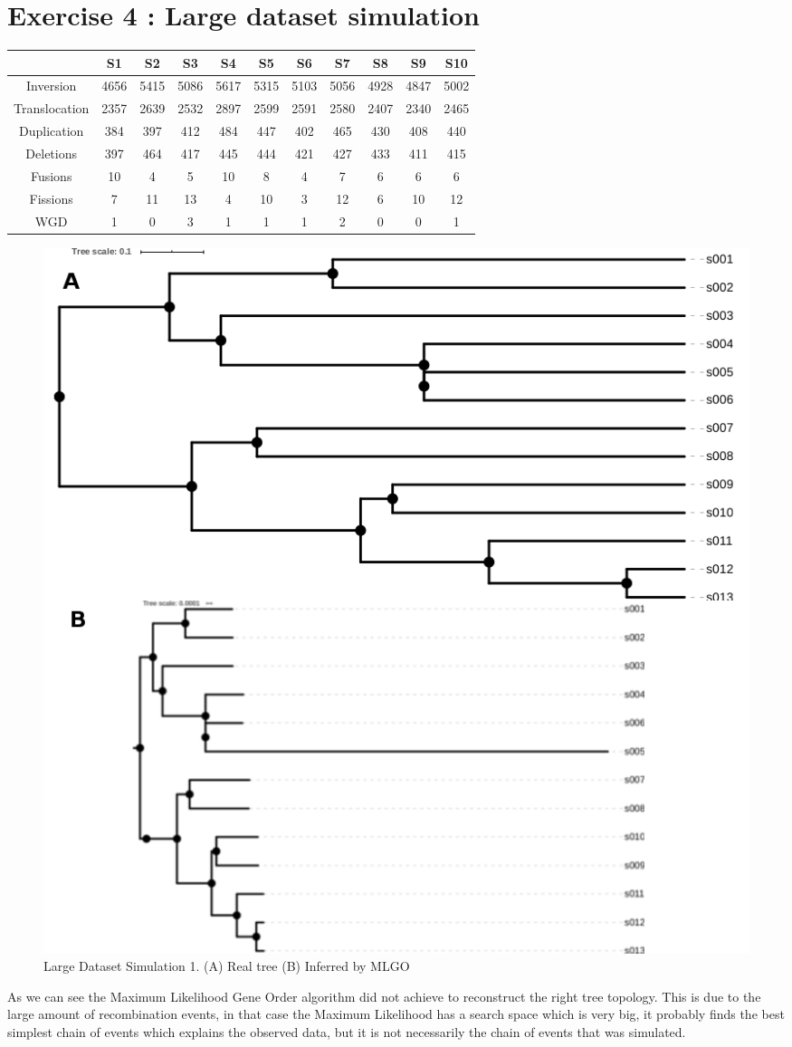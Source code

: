 \documentclass[]{article}
\theoremstyle{definition}
\begin{document}
\section{Exercise 4 : Large dataset simulation}
\begin{center}
	\begin{tabular}{|*{11}{c|}}
		\hline
		& S1& S2  & S3  & S4 & S5
		& S6& S7 & S8 & S9 & S10 \\
		\hline
		Inversion     &4656&5415&5086&5617&5315&5103&5056&4928&4847&5002 \\
		\hline
		Translocation &2357&2639&2532&2897&2599&2591&2580&2407&2340&2465 \\
		\hline
		Duplication   &384 &397 &412 &484 &447 &402 &465 &430 &408 &440  \\
		\hline
		Deletions     &397 &464 &417 &445 &444 &421 &427 &433 &411 &415  \\
		\hline
		Fusions       &10  &4   &5   &10  &8   &4   &7   &6   &6   &6    \\
		\hline
		Fissions      &7   &11  &13  &4   &10  &3   &12  &6   &10  &12   \\
		\hline
		WGD           &1   &0   &3   &1   &1   &1   &2   &0   &0   &1    \\
		\hline
	\end{tabular}
\end{center}

\begin{figure}[H]
	\includegraphics*[width = \linewidth]{image/new/large_1.png}
	\caption{ Large Dataset Simulation 1. (A) Real tree (B) Inferred by MLGO}
\end{figure}

As we can see the Maximum Likelihood Gene Order algorithm did not achieve to reconstruct the right tree topology. This is due to the large amount of recombination events, in that case the Maximum Likelihood has a search space which is very big, it probably finds the best simplest chain of events which explains the observed data, but it is not necessarily the chain of events that was simulated.
\end{document}
